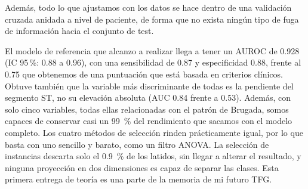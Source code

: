 Además, todo lo que ajustamos con los datos se hace dentro de una validación cruzada anidada a nivel de paciente, de forma que no exista ningún tipo de fuga de información hacia el conjunto de test.

El modelo de referencia que alcanzo a realizar llega a tener un AUROC de \num{0.928} (IC 95\,\%: \num{0.88} a \num{0.96}), con una sensibilidad de \num{0.87} y especificidad \num{0.88}, frente al \num{0.75} que obtenemos de una puntuación que está basada en criterios clínicos. Obtuve también que la variable más discriminante de todas es la pendiente del segmento ST, no su elevación absoluta (AUC \num{0.84} frente a \num{0.53}). Además, con solo cinco variables, todas ellas relacionadas con el patrón de Brugada, somos capaces de conservar casi un \SI{99}{\percent} del rendimiento que sacamos con el modelo completo. Los cuatro métodos de selección rinden prácticamente igual, por lo que basta con uno sencillo y barato, como un filtro ANOVA. La selección de instancias descarta solo el \SI{0.9}{\percent} de los latidos, sin llegar a alterar el resultado, y ninguna proyección en dos dimensiones es capaz de separar las clases. Esta primera entrega de teoría es una parte de la memoria de mi futuro TFG.
